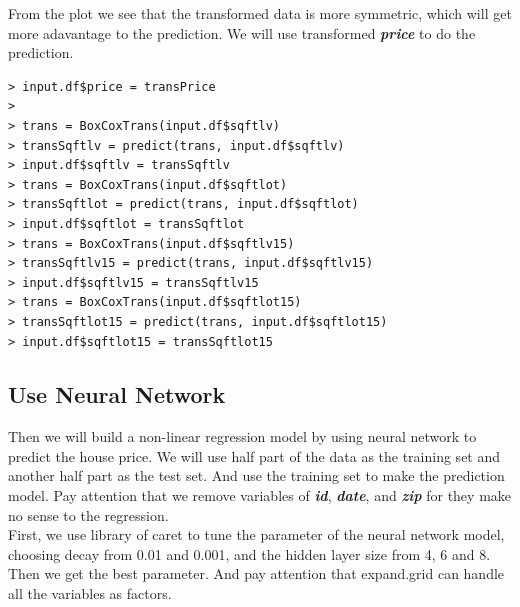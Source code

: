 \documentclass{article}%
\begin{document}
From the plot we see that the transformed data is more symmetric, which will get more adavantage to the prediction. We will use transformed  \emph{\textbf{price}} to do the prediction.
\begin{verbatim}
> input.df$price = transPrice
>
> trans = BoxCoxTrans(input.df$sqftlv)
> transSqftlv = predict(trans, input.df$sqftlv)
> input.df$sqftlv = transSqftlv
> trans = BoxCoxTrans(input.df$sqftlot)
> transSqftlot = predict(trans, input.df$sqftlot)
> input.df$sqftlot = transSqftlot
> trans = BoxCoxTrans(input.df$sqftlv15)
> transSqftlv15 = predict(trans, input.df$sqftlv15)
> input.df$sqftlv15 = transSqftlv15
> trans = BoxCoxTrans(input.df$sqftlot15)
> transSqftlot15 = predict(trans, input.df$sqftlot15)
> input.df$sqftlot15 = transSqftlot15
\end{verbatim}
\subsection{Use Neural Network}
Then we will build a non-linear regression model by using neural network to predict the house price. We will use half part of the data as the training set and another half part as the test set. And use the training set to make the prediction model. Pay attention that we remove variables of  \emph{\textbf{id}},  \emph{\textbf{date}},  and \emph{\textbf{zip}} for they make no sense to the regression.\\
\indent First, we use library of caret to tune the parameter of the neural network model, choosing decay from 0.01 and 0.001, and the hidden layer size from 4, 6 and 8. Then we get the best parameter. And pay attention that expand.grid can handle all the variables as factors.
\end{document}
